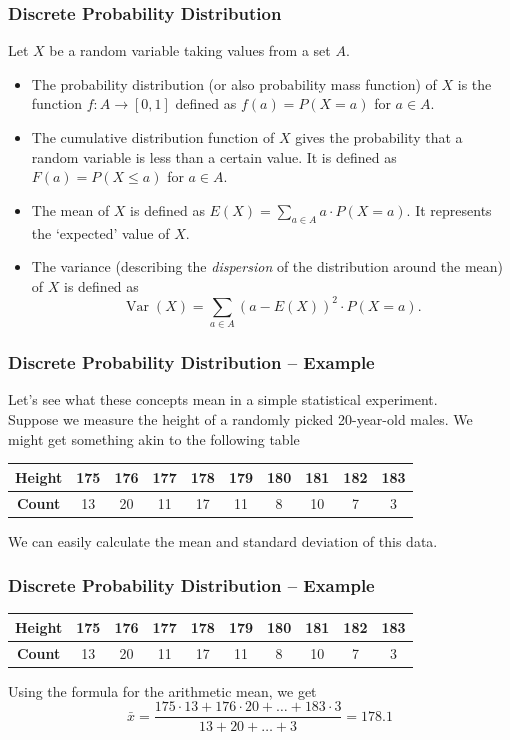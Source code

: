 \documentclass[aspectratio=169,11pt,usenames,dvipsnames]{beamer}
\DeclareMathOperator{\var}{Var}
\begin{document}
\begin{frame}
 \subsectionpage
\end{frame}

\begin{frame}
 \frametitle{Discrete Probability Distribution}
 Let $X$ be a random variable taking values from a set $A$.\pause
 \begin{itemize}
  \item The \alert{probability distribution} (or also \alert{probability mass
   function}) of $X$ is the function $f:A \to [0,1]$ defined as $f(a) = P(X =
   a)$ for $a \in A$. \pause
  \item The \alert{cumulative distribution function} of $X$ gives the
   probability that a random variable is \alert{less than a certain value}. It
   is defined as $F(a) = P(X \leq a)$ for $a \in A$. \pause
  \item The \alert{mean} of $X$ is defined as $E(X) = \sum_{a \in A} a \cdot P(X = a)$.
   It represents the `expected' value of $X$. \pause
  \item The \alert{variance} (describing the \emph{dispersion} of the
   distribution around the mean) of $X$ is defined as
   \[
    \var(X) = \sum_{a \in A} (a - E(X))^2 \cdot P(X = a).
   \]
 \end{itemize}
\end{frame}

\begin{frame}
 \frametitle{Discrete Probability Distribution -- Example}
 Let's see what these concepts mean in a simple statistical experiment.\\ \pause
 Suppose we measure the height of a randomly picked 20-year-old males. We might
 get something akin to the following table
 \begin{center}
  \begin{tabular}{c|ccccccccc}
   \textbf{Height} & 175 & 176 & 177 & 178 & 179 & 180 & 181 & 182 & 183\\
   \midrule
   \textbf{Count} & 13 & 20 & 11 & 17 & 11 & 8 & 10 & 7 & 3
  \end{tabular}
 \end{center}
 \pause
 We can easily calculate the mean and standard deviation of this data. 
\end{frame}

\begin{frame}
 \frametitle{Discrete Probability Distribution -- Example}
  \begin{center}
  \begin{tabular}{c|ccccccccc}
   \textbf{Height} & 175 & 176 & 177 & 178 & 179 & 180 & 181 & 182 & 183\\
   \midrule
   \textbf{Count} & 13 & 20 & 11 & 17 & 11 & 8 & 10 & 7 & 3
  \end{tabular}
 \end{center}
 Using the formula for the arithmetic mean, we get
 \[
  \bar{x} = \frac{175 \cdot 13 + 176 \cdot 20 + \ldots + 183 \cdot 3}{13 + 20 +
  \ldots + 3} = 178.1
 \]
\end{frame}
\end{document}

